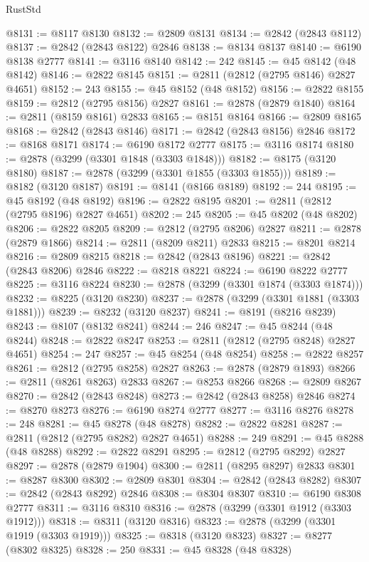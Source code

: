 \begin{lexlean}{RustStd}
\begin{coremodule}
@8131 := @8117 @8130
@8132 := @2809 @8131
@8134 := @2842 (@2843 @8112)
@8137 := @2842 (@2843 @8122) @2846
@8138 := @8134 @8137
@8140 := @6190 @8138 @2777
@8141 := @3116 @8140
@8142 := 242
@8145 := @45 @8142 (@48 @8142)
@8146 := @2822 @8145
@8151 := @2811 (@2812 (@2795 @8146) @2827 @4651)
@8152 := 243
@8155 := @45 @8152 (@48 @8152)
@8156 := @2822 @8155
@8159 := @2812 (@2795 @8156) @2827
@8161 := @2878 (@2879 @1840)
@8164 := @2811 (@8159 @8161) @2833
@8165 := @8151 @8164
@8166 := @2809 @8165
@8168 := @2842 (@2843 @8146)
@8171 := @2842 (@2843 @8156) @2846
@8172 := @8168 @8171
@8174 := @6190 @8172 @2777
@8175 := @3116 @8174
@8180 := @2878 (@3299 (@3301 @1848 (@3303 @1848)))
@8182 := @8175 (@3120 @8180)
@8187 := @2878 (@3299 (@3301 @1855 (@3303 @1855)))
@8189 := @8182 (@3120 @8187)
@8191 := @8141 (@8166 @8189)
@8192 := 244
@8195 := @45 @8192 (@48 @8192)
@8196 := @2822 @8195
@8201 := @2811 (@2812 (@2795 @8196) @2827 @4651)
@8202 := 245
@8205 := @45 @8202 (@48 @8202)
@8206 := @2822 @8205
@8209 := @2812 (@2795 @8206) @2827
@8211 := @2878 (@2879 @1866)
@8214 := @2811 (@8209 @8211) @2833
@8215 := @8201 @8214
@8216 := @2809 @8215
@8218 := @2842 (@2843 @8196)
@8221 := @2842 (@2843 @8206) @2846
@8222 := @8218 @8221
@8224 := @6190 @8222 @2777
@8225 := @3116 @8224
@8230 := @2878 (@3299 (@3301 @1874 (@3303 @1874)))
@8232 := @8225 (@3120 @8230)
@8237 := @2878 (@3299 (@3301 @1881 (@3303 @1881)))
@8239 := @8232 (@3120 @8237)
@8241 := @8191 (@8216 @8239)
@8243 := @8107 (@8132 @8241)
@8244 := 246
@8247 := @45 @8244 (@48 @8244)
@8248 := @2822 @8247
@8253 := @2811 (@2812 (@2795 @8248) @2827 @4651)
@8254 := 247
@8257 := @45 @8254 (@48 @8254)
@8258 := @2822 @8257
@8261 := @2812 (@2795 @8258) @2827
@8263 := @2878 (@2879 @1893)
@8266 := @2811 (@8261 @8263) @2833
@8267 := @8253 @8266
@8268 := @2809 @8267
@8270 := @2842 (@2843 @8248)
@8273 := @2842 (@2843 @8258) @2846
@8274 := @8270 @8273
@8276 := @6190 @8274 @2777
@8277 := @3116 @8276
@8278 := 248
@8281 := @45 @8278 (@48 @8278)
@8282 := @2822 @8281
@8287 := @2811 (@2812 (@2795 @8282) @2827 @4651)
@8288 := 249
@8291 := @45 @8288 (@48 @8288)
@8292 := @2822 @8291
@8295 := @2812 (@2795 @8292) @2827
@8297 := @2878 (@2879 @1904)
@8300 := @2811 (@8295 @8297) @2833
@8301 := @8287 @8300
@8302 := @2809 @8301
@8304 := @2842 (@2843 @8282)
@8307 := @2842 (@2843 @8292) @2846
@8308 := @8304 @8307
@8310 := @6190 @8308 @2777
@8311 := @3116 @8310
@8316 := @2878 (@3299 (@3301 @1912 (@3303 @1912)))
@8318 := @8311 (@3120 @8316)
@8323 := @2878 (@3299 (@3301 @1919 (@3303 @1919)))
@8325 := @8318 (@3120 @8323)
@8327 := @8277 (@8302 @8325)
@8328 := 250
@8331 := @45 @8328 (@48 @8328)

\end{coremodule}
\end{lexlean}
